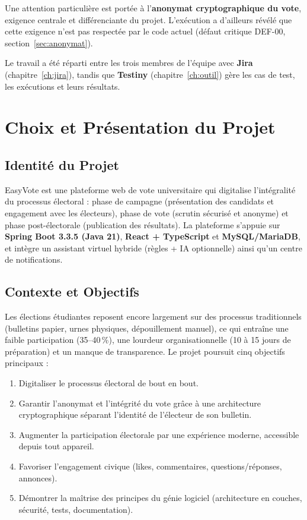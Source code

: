\documentclass[12pt,a4paper]{report}
\begin{document}
Une attention particulière est portée à l'\textbf{anonymat cryptographique du vote}, exigence centrale et différenciante du projet. L'exécution a d'ailleurs révélé que cette exigence n'est pas respectée par le code actuel (défaut critique DEF-00, section~\ref{sec:anonymat}).

Le travail a été réparti entre les trois membres de l'équipe avec \textbf{Jira} (chapitre~\ref{ch:jira}), tandis que \textbf{Testiny} (chapitre~\ref{ch:outil}) gère les cas de test, les exécutions et leurs résultats.

\chapter{Choix et Présentation du Projet}\label{ch:projet}

\section{Identité du Projet}
EasyVote est une plateforme web de vote universitaire qui digitalise l'intégralité du processus électoral : phase de campagne (présentation des candidats et engagement avec les électeurs), phase de vote (scrutin sécurisé et anonyme) et phase post-électorale (publication des résultats). La plateforme s'appuie sur \textbf{Spring Boot 3.3.5 (Java 21)}, \textbf{React + TypeScript} et \textbf{MySQL/MariaDB}, et intègre un assistant virtuel hybride (règles + IA optionnelle) ainsi qu'un centre de notifications.

\section{Contexte et Objectifs}
Les élections étudiantes reposent encore largement sur des processus traditionnels (bulletins papier, urnes physiques, dépouillement manuel), ce qui entraîne une faible participation (35--40\,\%), une lourdeur organisationnelle (10 à 15 jours de préparation) et un manque de transparence. Le projet poursuit cinq objectifs principaux :
\begin{enumerate}
  \item Digitaliser le processus électoral de bout en bout.
  \item Garantir l'anonymat et l'intégrité du vote grâce à une architecture cryptographique séparant l'identité de l'électeur de son bulletin.
  \item Augmenter la participation électorale par une expérience moderne, accessible depuis tout appareil.
  \item Favoriser l'engagement civique (likes, commentaires, questions/réponses, annonces).
  \item Démontrer la maîtrise des principes du génie logiciel (architecture en couches, sécurité, tests, documentation).
\end{enumerate}
\end{document}
